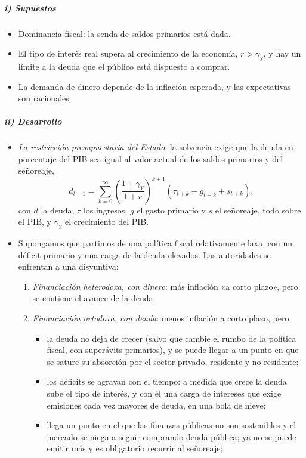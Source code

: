 \documentclass[11pt]{article}
\begin{document}
\subparagraph{i) Supuestos}

\begin{itemize}
\item Dominancia fiscal: la senda de saldos primarios está dada.
\item El tipo de interés real supera al crecimiento de la economía, $r>\gamma_Y$, y hay un límite a la deuda que el público está dispuesto a comprar.
\item La demanda de dinero depende de la inflación esperada, y las expectativas son racionales.
\end{itemize}

\subparagraph{ii) Desarrollo}

\begin{itemize}
\item \emph{La restricción presupuestaria del Estado}: la solvencia exige que la deuda en porcentaje del PIB sea igual al valor actual de los saldos primarios y del señoreaje,
  \begin{equation*}
  d_{t-1}=\sum_{k=0}^{\infty}\left(\frac{1+\gamma_Y}{1+r}\right)^{k+1}\left(\tau_{t+k}-g_{t+k}+s_{t+k}\right),
  \end{equation*}
  con $d$ la deuda, $\tau$ los ingresos, $g$ el gasto primario y $s$ el señoreaje, todo sobre el PIB, y $\gamma_Y$ el crecimiento del PIB.
\item Supongamos que partimos de una política fiscal relativamente laxa, con un déficit primario y una carga de la deuda elevados. Las autoridades se enfrentan a una disyuntiva:
  \begin{enumerate}[label=\alph*)]
  \item \emph{Financiación heterodoxa, con dinero}: más inflación «a corto plazo», pero se contiene el avance de la deuda.
  \item \emph{Financiación ortodoxa, con deuda}: menos inflación a corto plazo, pero:
    \begin{itemize}
    \item la deuda no deja de crecer (salvo que cambie el rumbo de la política fiscal, con superávits primarios), y se puede llegar a un punto en que se sature su absorción por el sector privado, residente y no residente;
    \item los déficits se agravan con el tiempo: a medida que crece la deuda sube el tipo de interés, y con él una carga de intereses que exige emisiones cada vez mayores de deuda, en una bola de nieve;
    \item llega un punto en el que las finanzas públicas no son sostenibles y el mercado se niega a seguir comprando deuda pública; ya no se puede emitir más y es obligatorio recurrir al señoreaje;

\end{itemize}
\end{enumerate}
\end{itemize}
\end{document}
